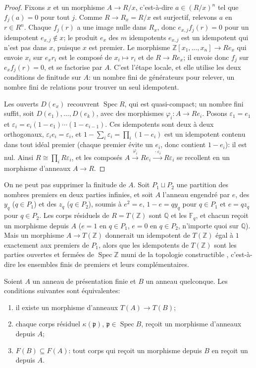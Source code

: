 \begin{proof}
Fixons $x$ et un morphisme $A\to R/x$, c'est-à-dire $a\in(R/x)^n$ tel que $f_j(a) = 0$ pour tout $j$. Comme $R\to R_x = R/x$ est surjectif, relevons $a$ en $r\in R^n$. Chaque $f_j(r)$ a une image nulle dans $R_x$, donc $e_{x,j}f_j(r) = 0$ pour un idempotent $e_{x,j}\notin x$; le produit $e_x$ des $m$ idempotents $e_{x,j}$ est un idempotent qui n'est pas dans $x$, puisque $x$ est premier. Le morphisme $\mathbb Z[x_1,\dots,x_n]\to Re_x$ qui envoie $x_i$ sur $e_xr_i$ est le composé de $x_i\mapsto r_i$ et de $R\to Re_x$; il envoie donc $f_j$ sur $e_xf_j(r) = 0$, et se factorise par $A$. C'est l'étape locale, et elle utilise les deux conditions de finitude sur $A$: un nombre fini de générateurs pour relever, un nombre fini de relations pour trouver un seul idempotent.

Les ouverts $D(e_x)$ recouvrent $\operatorname{Spec}R$, qui est quasi-compact; un nombre fini suffit, soit $D(e_1),\dots,D(e_k)$, avec des morphismes $\varphi_i\colon A\to Re_i$. Posons $\varepsilon_1 = e_1$ et $\varepsilon_i = e_i(1-e_1)\cdots(1-e_{i-1})$. Ces idempotents sont deux à deux orthogonaux, $\varepsilon_ie_i = \varepsilon_i$, et $1-\sum_i\varepsilon_i = \prod_i(1-e_i)$ est un idempotent contenu dans tout idéal premier (chaque premier évite un $e_i$, donc contient $1-e_i$): il est nul. Ainsi $R\cong\prod_iR\varepsilon_i$, et les composés $A\xrightarrow{\varphi_i}Re_i\xrightarrow{\ \cdot\varepsilon_i\ }R\varepsilon_i$ se recollent en un morphisme d'anneaux $A\to R$.
\end{proof}

On ne peut pas supprimer la finitude de $A$. Soit $P_1\sqcup P_2$ une partition des nombres premiers en deux parties infinies, et soit $A$ l'anneau engendré par $e$, des $y_q$ ($q\in P_1$) et des $z_q$ ($q\in P_2$), soumis à $e^2 = e$, $1-e = qy_q$ pour $q\in P_1$ et $e = qz_q$ pour $q\in P_2$. Les corps résiduels de $R = T(\mathbb Z)$ sont $\mathbb Q$ et les $\mathbb F_q$, et chacun reçoit un morphisme depuis $A$ ($e = 1$ en $q\in P_1$, $e = 0$ en $q\in P_2$, n'importe quoi sur $\mathbb Q$). Mais un morphisme $A\to T(\mathbb Z)$ donnerait un idempotent de $T(\mathbb Z)$ égal à $1$ exactement aux premiers de $P_1$, alors que les idempotents de $T(\mathbb Z)$ sont les parties ouvertes et fermées de $\operatorname{Spec}\mathbb Z$ muni de la topologie constructible \cite{olivier}, c'est-à-dire les ensembles finis de premiers et leurs complémentaires.

\begin{theorem}[critère]\label{th:pf-criterion}
Soient $A$ un anneau de présentation finie et $B$ un anneau quelconque. Les conditions suivantes sont équivalentes:
\begin{enumerate}
\item il existe un morphisme d'anneaux $T(A)\to T(B)$;
\item chaque corps résiduel $\kappa(\mathfrak p)$, $\mathfrak p\in\operatorname{Spec}B$, reçoit un morphisme d'anneaux depuis $A$;
\item $F(B)\subseteq F(A)$: tout corps qui reçoit un morphisme depuis $B$ en reçoit un depuis $A$.
\end{enumerate}
\end{theorem}

